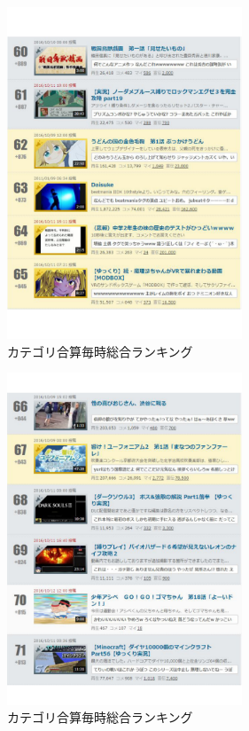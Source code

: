 \begin{figure}[htb]
\centering
\includegraphics[width=7cm]{r11.pdf}
\caption{カテゴリ合算毎時総合ランキング}\label{abe}
\end{figure}

\begin{figure}[htb]
\centering
\includegraphics[width=7cm]{r12.pdf}
\caption{カテゴリ合算毎時総合ランキング}\label{abf}
\end{figure}

